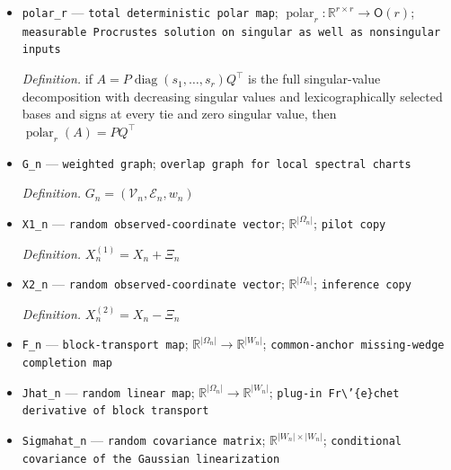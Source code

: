 \documentclass{article}
\begin{document}
\begin{itemize}
  \par\smallskip\noindent\emph{Definition.} \(\operatorname{qf}_r(H)\) applies exact-arithmetic modified Gram--Schmidt to the ordered list consisting of the \(r\) columns of \(H\), followed by \(e_1,\ldots,e_m\), skips zero residuals, fixes each sign by its first nonzero coordinate, and returns the first \(r\) accepted vectors; this is a measurable fallback when \(H\) is rank deficient
  \item \texttt{polar\_\allowbreak{}r} --- \texttt{total deterministic polar map}; \(\operatorname{polar}_r:\mathbb R^{r\times r}\to\mathsf O(r)\); \texttt{measurable Procrustes solution on singular as well as nonsingular inputs}
  \par\smallskip\noindent\emph{Definition.} if \(A=P\operatorname{diag}(s_1,\ldots,s_r)Q^{\top}\) is the full singular-value decomposition with decreasing singular values and lexicographically selected bases and signs at every tie and zero singular value, then \(\operatorname{polar}_r(A)=PQ^{\top}\)
  \item \texttt{G\_\allowbreak{}n} --- \texttt{weighted graph}; \texttt{overlap graph for local spectral charts}
  \par\smallskip\noindent\emph{Definition.} \(G_n=(\mathcal V_n,\mathcal E_n,w_n)\)
  \item \texttt{X1\_\allowbreak{}n} --- \texttt{random observed-\allowbreak{}coordinate vector}; \(\mathbb R^{|\Omega_n|}\); \texttt{pilot copy}
  \par\smallskip\noindent\emph{Definition.} \(X_n^{(1)}=X_n+\Xi_n\)
  \item \texttt{X2\_\allowbreak{}n} --- \texttt{random observed-\allowbreak{}coordinate vector}; \(\mathbb R^{|\Omega_n|}\); \texttt{inference copy}
  \par\smallskip\noindent\emph{Definition.} \(X_n^{(2)}=X_n-\Xi_n\)
  \item \texttt{F\_\allowbreak{}n} --- \texttt{block-\allowbreak{}transport map}; \(\mathbb R^{|\Omega_n|}\to\mathbb R^{|W_n|}\); \texttt{common-\allowbreak{}anchor missing-\allowbreak{}wedge completion map}
  \item \texttt{Jhat\_\allowbreak{}n} --- \texttt{random linear map}; \(\mathbb R^{|\Omega_n|}\to\mathbb R^{|W_n|}\); \texttt{plug-\allowbreak{}in Fr\textbackslash{}\allowbreak{}'\{e\}\allowbreak{}chet derivative of block transport}
  \item \texttt{Sigmahat\_\allowbreak{}n} --- \texttt{random covariance matrix}; \(\mathbb R^{|W_n|\times|W_n|}\); \texttt{conditional covariance of the Gaussian linearization}

\end{itemize}
\end{document}
